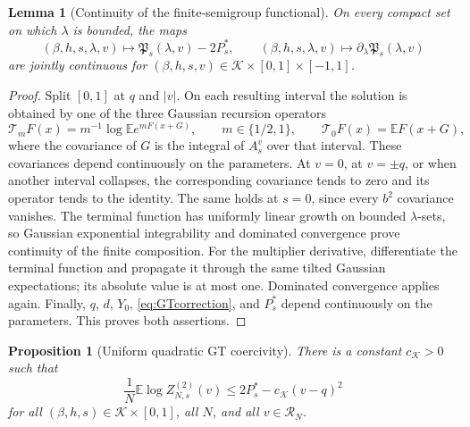 \documentclass[11pt]{article}
\numberwithin{equation}{section}
\theoremstyle{plain}
\newtheorem{proposition}[theorem]{Proposition}
\newtheorem{lemma}[theorem]{Lemma}
\theoremstyle{definition}
\newcommand{\E}{\mathbb E}
\newcommand{\1}{\mathbf 1}
\newcommand{\cK}{\mathcal K}
\begin{document}
\begin{lemma}[Continuity of the finite-semigroup functional]
\label{lem:GTcontinuity}
On every compact set on which $\lambda$ is bounded, the maps
\[
 (\beta,h,s,\lambda,v)\longmapsto
 \mathfrak P_s(\lambda,v)-2P_s^*,
 \qquad
 (\beta,h,s,\lambda,v)\longmapsto
 \partial_\lambda\mathfrak P_s(\lambda,v)
\]
are jointly continuous for
$(\beta,h,s,v)\in\cK\times[0,1]\times[-1,1]$.
\end{lemma}

\begin{proof}
Split $[0,1]$ at $q$ and $|v|$.  On each resulting interval the
solution is obtained by one of the three Gaussian recursion operators
\[
 \mathcal T_mF(x)=m^{-1}\log\E e^{mF(x+G)},
 \qquad m\in\{1/2,1\},
 \qquad
 \mathcal T_0F(x)=\E F(x+G),
\]
where the covariance of $G$ is the integral of $A_s^v$ over that
interval.  These covariances depend continuously on the parameters.
At $v=0$, at $v=\pm q$, or when another interval collapses, the
corresponding covariance tends to zero and its operator tends to the
identity.  The same holds at $s=0$, since every $b^2$ covariance
vanishes.  The terminal function has uniformly linear growth on
bounded $\lambda$-sets, so Gaussian exponential integrability and
dominated convergence prove continuity of the finite composition.
For the multiplier derivative, differentiate the terminal function
and propagate it through the same tilted Gaussian expectations; its
absolute value is at most one.  Dominated convergence applies again.
Finally, $q$, $d$, $Y_0$, \eqref{eq:GTcorrection}, and $P_s^*$ depend
continuously on the parameters.  This proves both assertions.
\end{proof}

\begin{proposition}[Uniform quadratic GT coercivity]
\label{prop:GTcoercivity}
There is a constant $c_{\cK}>0$ such that
\begin{equation}
 \frac1N\E\log Z^{(2)}_{N,s}(v)
 \le 2P_s^*-c_{\cK}(v-q)^2
 \label{eq:GTcoercivity}
\end{equation}
for all $(\beta,h,s)\in\cK\times[0,1]$, all $N$, and all
$v\in\mathcal R_N$.
\end{proposition}
\end{document}

